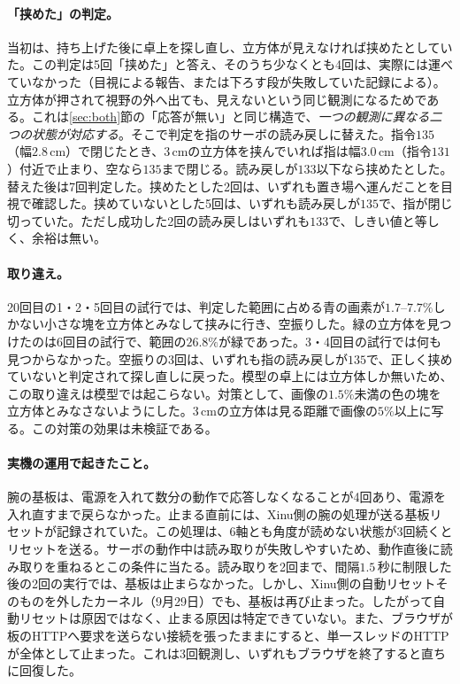 \documentclass[10pt,letterpaper]{article}
\begin{document}
\paragraph{「挟めた」の判定。}当初は、持ち上げた後に卓上を探し直し、立方体が見えなければ挟めたとしていた。この判定は5回「挟めた」と答え、そのうち少なくとも4回は、実際には運べていなかった（目視による報告、または下ろす段が失敗していた記録による）。立方体が押されて視野の外へ出ても、見えないという同じ観測になるためである。これは\ref{sec:both}節の「応答が無い」と同じ構造で、\emph{一つの観測に異なる二つの状態が対応する}。そこで判定を指のサーボの読み戻しに替えた。指令$135$（幅$2.8$\,cm）で閉じたとき、$3$\,cmの立方体を挟んでいれば指は幅$3.0$\,cm（指令$131$）付近で止まり、空なら$135$まで閉じる。読み戻しが$133$以下なら挟めたとした。替えた後は7回判定した。挟めたとした2回は、いずれも置き場へ運んだことを目視で確認した。挟めていないとした5回は、いずれも読み戻しが$135$で、指が閉じ切っていた。ただし成功した2回の読み戻しはいずれも$133$で、しきい値と等しく、余裕は無い。

\paragraph{取り違え。}20回目の1・2・5回目の試行では、判定した範囲に占める青の画素が$1.7$--$7.7\%$しかない小さな塊を立方体とみなして挟みに行き、空振りした。緑の立方体を見つけたのは6回目の試行で、範囲の$26.8\%$が緑であった。3・4回目の試行では何も見つからなかった。空振りの3回は、いずれも指の読み戻しが$135$で、正しく挟めていないと判定されて探し直しに戻った。模型の卓上には立方体しか無いため、この取り違えは模型では起こらない。対策として、画像の$1.5\%$未満の色の塊を立方体とみなさないようにした。$3$\,cmの立方体は見る距離で画像の$5\%$以上に写る。この対策の効果は未検証である。

\paragraph{実機の運用で起きたこと。}腕の基板は、電源を入れて数分の動作で応答しなくなることが4回あり、電源を入れ直すまで戻らなかった。止まる直前には、Xinu側の腕の処理が送る基板リセットが記録されていた。この処理は、6軸とも角度が読めない状態が3回続くとリセットを送る。サーボの動作中は読み取りが失敗しやすいため、動作直後に読み取りを重ねるとこの条件に当たる。読み取りを2回まで、間隔$1.5$\,秒に制限した後の2回の実行では、基板は止まらなかった。しかし、Xinu側の自動リセットそのものを外したカーネル（9月29日）でも、基板は再び止まった。したがって自動リセットは原因ではなく、止まる原因は特定できていない。また、ブラウザが板のHTTPへ要求を送らない接続を張ったままにすると、単一スレッドのHTTPが全体として止まった。これは3回観測し、いずれもブラウザを終了すると直ちに回復した。
\end{document}

